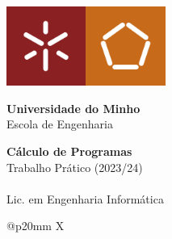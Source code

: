 \begin{titlepage}
\includegraphics[width=26mm]{cp2324t_media/UM.jpg}\includegraphics[width=26mm]{cp2324t_media/EE.jpg}

\vspace{7mm}
\leading{17pt}
{\Large
\textbf{Universidade do Minho}
\\
{\selectfont
Escola de Engenharia
}}

\vspace{50mm}
\leading{27pt}
{\huge
\textbf{Cálculo de Programas}
\\
Trabalho Prático (2023/24)}
\\
%
\\
{\LARGE
Lic. em Engenharia Informática}

\vspace{50mm}
\leading{15pt}
{\Large
\begin{tabularx}{\textwidth}{@{}p{20mm} X}
     \\
     \\
    \thestudentA \\
    \thestudentB \\
    \thestudentC \\
\end{tabularx}
}

\vspace*{\fill}
{\large \myear}
\end{titlepage}
